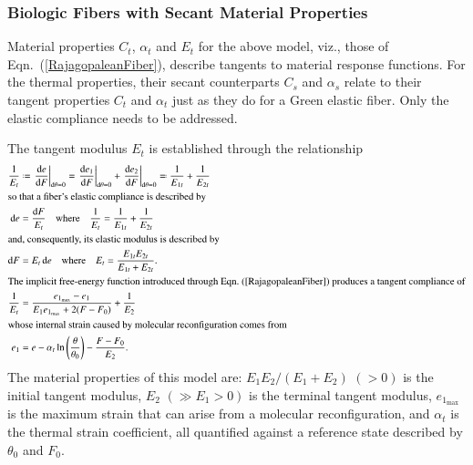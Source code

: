 \subsubsection{Biologic Fibers with Secant Material Properties}

Material properties $C_t$, $\alpha_t$ and $E_t$ for the above model, viz., those of Eqn.~(\ref{RajagopaleanFiber}), describe tangents to material response functions.  For the thermal properties, their secant counterparts $C_s$ and $\alpha_s$ relate to their tangent properties $C_t$ and $\alpha_t$ just as they do for a Green elastic fiber.  Only the elastic compliance needs to be addressed.

The tangent modulus $E_t$ is established through the relationship
\begin{subequations}
    \label{tangentModuliFiber}
    \begin{align}
    \frac{1}{E_t} & \defeq 
    \left. \frac{\mathrm{d}e}{\mathrm{d}F}
    \right|_{\mathrm{d}\theta = 0} = 
    \left. \frac{\mathrm{d}e_1}{\mathrm{d}F}
    \right|_{\mathrm{d}\theta = 0} + 
    \left. \frac{\mathrm{d}e_2}{\mathrm{d}F}
    \right|_{\mathrm{d}\theta = 0} \eqdef
    \frac{1}{E_{1t}} + \frac{1}{E_{2t}}
    \label{defineTangentModuliFiber} \\
    \intertext{so that a fiber's elastic compliance is described by}
    \mathrm{d}e & = \frac{\mathrm{d}F}{E_t} 
    \quad \text{where} \quad
    \frac{1}{E_t} = \frac{1}{E_{1t}} + \frac{1}{E_{2t}} \\
    \intertext{and, consequently, its elastic modulus is described by}
    \mathrm{d}F & = E_t \, \mathrm{d}e
    \quad \text{where} \quad
    E_t = \frac{E_{1t} E_{2t}}{E_{1t} + E_{2t}} . \\
    \intertext{The implicit free-energy function introduced through Eqn.~(\ref{RajagopaleanFiber}) produces a tangent compliance of}
    \frac{1}{E_t} & =
    \frac{e_{1_{\max}} - e_1}{E_1 e_{1_{\max}} + 2(F - F_0)} + \frac{1}{E_2} 
    \label{tangentModuliBioFiber} \\
    \intertext{whose internal strain caused by molecular reconfiguration comes from}
    e_1 & = e - \alpha_t \ln \left( \frac{\theta}{\theta_0} \right) -
    \frac{F-F_0}{E_2} .
    \label{reconfigurationStrainFiber}
    \end{align}
\end{subequations}
The material properties of this model are: $E_1 E_2 / (E_1 + E_2)$ $(>0)$ is the initial tangent modulus, $E_2$ $(\gg E_1 > 0)$ is the terminal tangent modulus, $e_{1_{\max}}$ is the maximum strain that can arise from a molecular reconfiguration, and $\alpha_t$ is the thermal strain coefficient, all quantified against a reference state described by $\theta_0$ and $F_0$. 
 
